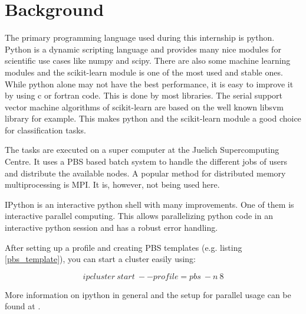 %

\section{Background}

The primary programming language used during this internship is python.
Python is a dynamic scripting language and provides many nice modules
for scientific use cases like numpy and scipy. There are also some
machine learning modules and the scikit-learn module \cite{sklearn}
is one of the most used and stable ones. While python alone may not
have the best performance, it is easy to improve it by using c or
fortran code. This is done by most libraries. The serial support vector
machine algorithms of scikit-learn are based on the well known libsvm
library for example. This makes python and the scikit-learn module
a good choice for classification tasks. 

The tasks are executed on a super computer at the Juelich Supercomputing
Centre. It uses a PBS based batch system to handle the different jobs
of users and distribute the available nodes. A popular method for
distributed memory multiprocessing is MPI. It is, however, not being
used here.

IPython is an interactive python shell with many improvements. One
of them is interactive parallel computing. This allows parallelizing
python code in an interactive python session and has a robust error
handling. 



After setting up a profile and creating PBS templates (e.g. listing
\ref{pbs_template}), you can start a cluster easily using:

\[
ipcluster~start~--profile=pbs~-n~8
\]




More information on ipython in general and the setup for parallel
usage can be found at \cite{ipython_doc}.%

